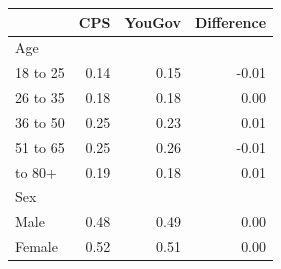 
\begin{tabular}{lrrr}
\toprule
 & CPS & YouGov & Difference\\
\midrule
Age &  &  & \\
18 to 25 & 0.14 & 0.15 & -0.01\\
26 to 35 & 0.18 & 0.18 & 0.00\\
36 to 50 & 0.25 & 0.23 & 0.01\\
51 to 65 & 0.25 & 0.26 & -0.01\\
\addlinespace
66 to 80+ & 0.19 & 0.18 & 0.01\\
Sex &  &  & \\
Male & 0.48 & 0.49 & 0.00\\
Female & 0.52 & 0.51 & 0.00\\
\bottomrule
\end{tabular}
